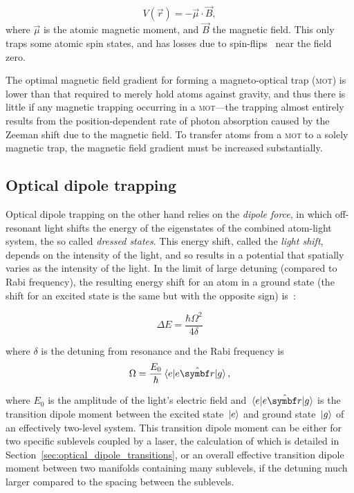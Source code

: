 \begin{equation}
V(\vec{r}) = -\vec \mu \cdot \vec B,
\end{equation}
where $\vec\mu$ is the atomic magnetic moment, and $\vec B$ the magnetic field. This only traps some atomic spin states, and has losses due to spin-flips~\cite{brink_majorana_2006} near the field zero.

The optimal magnetic field gradient for forming a magneto-optical trap (\textsc{mot}) is lower than that required to merely hold atoms against gravity, and thus there is little if any magnetic trapping occurring in a \textsc{mot}---the trapping almost entirely results from the position-dependent rate of photon absorption caused by the Zeeman shift due to the magnetic field. To transfer atoms from a \textsc{mot} to a solely magnetic trap, the magnetic field gradient must be increased substantially.

\subsection{Optical dipole trapping}

Optical dipole trapping on the other hand relies on the \emph{dipole force}, in which off-resonant light shifts the energy of the eigenstates of the combined atom-light system, the so called \emph{dressed states}. This energy shift, called the \emph{light shift}, depends on the intensity of the light, and so results in a potential that spatially varies as the intensity of the light. In the limit of large detuning (compared to Rabi frequency), the resulting energy shift for an atom in a ground state (the shift for an excited state is the same but with the opposite sign) is~\cite[p 8]{metcalf_laser_1999}:

\begin{equation}
\Delta E = \frac{\hbar\Omega^2}{4\delta}
\end{equation}

where $\delta$ is the detuning from resonance and the Rabi frequency is
\begin{equation}
\Omega=\frac{E_0}\hbar\matrixel{e}{e\hat{\vec r}}{g},
\end{equation}

where $E_0$ is the amplitude of the light's electric field and  $\matrixel{e}{e\hat{\vec r}}{g}$ is the transition dipole moment between the excited state $\ket{e}$ and ground state $\ket{g}$ of an effectively two-level system. This transition dipole moment can be either for two specific sublevels coupled by a laser, the calculation of which is detailed in Section~\ref{sec:optical_dipole_transitions}, or an overall effective transition dipole moment between two manifolds containing many sublevels, if the detuning much larger compared to the spacing between the sublevels.

